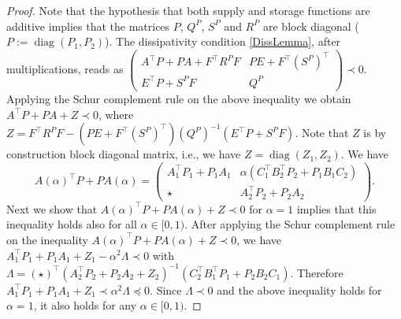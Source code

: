 \documentclass[11pt,a4paper,oneside,DIV=12,headings=small]{scrartcl}
\newcommand{\diag}{\operatorname{diag}}
\theoremstyle{plain}
\begin{document}
\begin{proof}
Note that the hypothesis that both supply and storage functions are additive implies that the matrices $P$, $Q^P$, $S^P$ and $R^P$ are block diagonal ($P:=\diag(P_1,P_2)$). The dissipativity condition \eqref{DissLemma}, after multiplications, reads as
$\left(\begin{smallmatrix}
A^\top P + P A + F^\top R^P F & P E + F^\top (S^P)^\top \\
E^\top P + S^P F & Q^P 
\end{smallmatrix}\right) \prec 0.$
Applying the Schur complement rule on the above inequality we obtain $A^\top P + P A + Z \prec 0$, where $Z=F^\top R^P F - (P E + F^\top (S^P)^\top) (Q^P)^{-1}(E^\top P + S^P F)$.
Note that $Z$ is by construction block diagonal matrix, i.e., we have $Z=\diag(Z_1,Z_2)$.
We have
\[
A(\alpha)^\top P + P A(\alpha)=\begin{pmatrix} A_1^\top P_1 + P_1 A_1 & \alpha (C_1^\top B_2^\top P_2 + P_1 B_1 C_2) 
\\ \star & A_2^\top P_2 + P_2 A_2 \end{pmatrix}.
\] 
Next we show that $A(\alpha)^\top P + P A(\alpha) + Z \prec 0$ for $\alpha =1$ implies that this inequality holds also for all $\alpha \in [0,1)$. 
After applying the Schur complement rule on the inequality $A(\alpha)^\top P + P A(\alpha) + Z \prec 0$, we have 
$A_1^\top P_1 + P_1 A_1 + Z_1 - \alpha^2 \Lambda \prec 0$ with
$\Lambda=(\star)^\top(A_2^\top P_2 + P_2 A_2 + Z_2)^{-1}(C_2^\top B_1^\top P_1 + P_2 B_2 C_1)$. Therefore $A_1^\top P_1 + P_1 A_1 + Z_1 \prec \alpha^2 \Lambda \preceq 0$.
Since $\Lambda \prec 0$ and the above inequality holds for $\alpha =1$, it also holds for any  $\alpha \in [0,1)$.
\end{proof}
\end{document}
